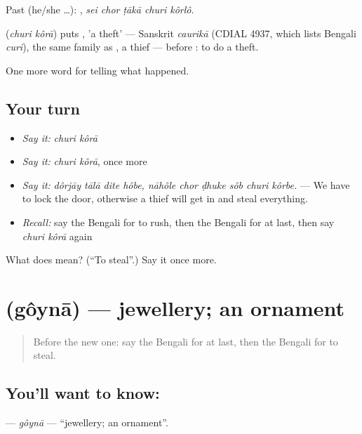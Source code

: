 Past (he/she …):     , \emph{sei chor ṭākā churi kôrlô}.

\begin{cousinweb}
\textbf{ } (\emph{churi kôrā}) puts , 'a theft' — Sanskrit \emph{caurikā} (CDIAL 4937, which lists Bengali \emph{curi}), the same family as \textbf{}, a thief — before : to do a theft.
\end{cousinweb}

\begin{grammarlens}[title={What you've built}]
One more word for telling what happened.
\end{grammarlens}

\subsection*{Your turn}
\begin{itemize}
\raggedright
  \item \emph{Say it:} \emph{churi kôrā}
  \item \emph{Say it:} \emph{churi kôrā}, once more
  \item \emph{Say it:} \emph{dôrjāy tālā dite hôbe, nāhôle chor ḍhuke sôb churi kôrbe.} — We have to lock the door, otherwise a thief will get in and steal everything.
  \item \emph{Recall:} say the Bengali for to rush, then the Bengali for at last, then say \emph{churi kôrā} again
\end{itemize}

\begin{tcolorbox}[breakable,colback=teal!4,colframe=teal!35!black,title={Before you move on}]
What does   mean? (\textquotedblleft{}To steal\textquotedblright{}.) Say it once more.
\end{tcolorbox}
\section[\texorpdfstring{\bn{গয়না} (gôynā)}{গয়না (gôynā)}]{ (gôynā) — jewellery; an ornament}

\label{lesson:BN-C282-goyna}



\begin{quote}
Before the new one: say the Bengali for at last, then the Bengali for to steal.
\end{quote}

\subsection*{You'll want to know: }
\textbf{} — \emph{gôynā} — \textquotedblleft{}jewellery; an ornament\textquotedblright{}.

